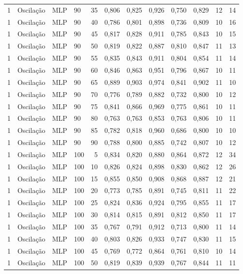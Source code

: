 \begin{longtable}{ccclrrrrrrrr}
1 & Oscilação & MLP & 90 & 35 & 0,806 & 0,825 & 0,926 & 0,750 & 0,829 & 12 & 14 \\
1 & Oscilação & MLP & 90 & 40 & 0,786 & 0,801 & 0,898 & 0,736 & 0,809 & 10 & 16 \\
1 & Oscilação & MLP & 90 & 45 & 0,817 & 0,828 & 0,911 & 0,785 & 0,843 & 10 & 15 \\
1 & Oscilação & MLP & 90 & 50 & 0,819 & 0,822 & 0,887 & 0,810 & 0,847 & 11 & 13 \\
1 & Oscilação & MLP & 90 & 55 & 0,835 & 0,843 & 0,911 & 0,804 & 0,854 & 11 & 14 \\
1 & Oscilação & MLP & 90 & 60 & 0,846 & 0,863 & 0,951 & 0,796 & 0,867 & 10 & 11 \\
1 & Oscilação & MLP & 90 & 65 & 0,889 & 0,903 & 0,974 & 0,841 & 0,902 & 11 & 10 \\
1 & Oscilação & MLP & 90 & 70 & 0,776 & 0,789 & 0,882 & 0,732 & 0,800 & 10 & 12 \\
1 & Oscilação & MLP & 90 & 75 & 0,841 & 0,866 & 0,969 & 0,775 & 0,861 & 10 & 11 \\
1 & Oscilação & MLP & 90 & 80 & 0,763 & 0,763 & 0,853 & 0,763 & 0,806 & 10 & 11 \\
1 & Oscilação & MLP & 90 & 85 & 0,782 & 0,818 & 0,960 & 0,686 & 0,800 & 10 & 10 \\
1 & Oscilação & MLP & 90 & 90 & 0,788 & 0,800 & 0,885 & 0,742 & 0,807 & 10 & 12 \\
1 & Oscilação & MLP & 100 & 5 & 0,834 & 0,820 & 0,880 & 0,864 & 0,872 & 12 & 34 \\
1 & Oscilação & MLP & 100 & 10 & 0,826 & 0,824 & 0,898 & 0,830 & 0,862 & 12 & 26 \\
1 & Oscilação & MLP & 100 & 15 & 0,855 & 0,850 & 0,908 & 0,868 & 0,887 & 12 & 21 \\
1 & Oscilação & MLP & 100 & 20 & 0,773 & 0,785 & 0,891 & 0,745 & 0,811 & 11 & 22 \\
1 & Oscilação & MLP & 100 & 25 & 0,824 & 0,836 & 0,924 & 0,795 & 0,855 & 11 & 17 \\
1 & Oscilação & MLP & 100 & 30 & 0,814 & 0,815 & 0,891 & 0,812 & 0,850 & 11 & 17 \\
1 & Oscilação & MLP & 100 & 35 & 0,767 & 0,791 & 0,912 & 0,713 & 0,800 & 11 & 14 \\
1 & Oscilação & MLP & 100 & 40 & 0,803 & 0,826 & 0,933 & 0,747 & 0,830 & 11 & 15 \\
1 & Oscilação & MLP & 100 & 45 & 0,769 & 0,772 & 0,864 & 0,761 & 0,810 & 10 & 14 \\
1 & Oscilação & MLP & 100 & 50 & 0,819 & 0,839 & 0,939 & 0,767 & 0,844 & 11 & 11 \\

\end{longtable}
